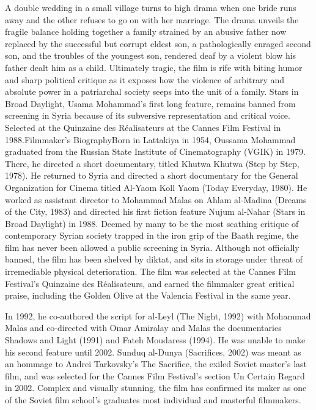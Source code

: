 \documentclass{article}
\begin{document}
A double wedding in a small village turns to high drama when one bride runs away and the other refuses to go on with her marriage. The drama unveils the fragile balance holding together a family strained by an abusive father now replaced by the successful but corrupt eldest son, a pathologically enraged second son, and the troubles of the youngest son, rendered deaf by a violent blow his father dealt him as a child. Ultimately tragic, the film is rife with biting humor and sharp political critique as it exposes how the violence of arbitrary and absolute power in a patriarchal society seeps into the unit of a family. Stars in Broad Daylight, Usama Mohammad’s first long feature, remains banned from screening in Syria because of its subversive representation and critical voice. Selected at the Quinzaine des Réalisateurs at the Cannes Film Festival in 1988.Filmmaker’s BiographyBorn in Lattakiya in 1954, Oussama Mohammad graduated from the Russian State Institute of Cinematography (VGIK) in 1979. There, he directed a short documentary, titled Khutwa Khutwa (Step by Step, 1978). He returned to Syria and directed a short documentary for the General Organization for Cinema titled Al-Yaom Koll Yaom (Today Everyday, 1980). He worked as assistant director to Mohammad Malas on Ahlam al-Madina (Dreams of the City, 1983) and directed his first fiction feature Nujum al-Nahar (Stars in Broad Daylight) in 1988. Deemed by many to be the most scathing critique of contemporary Syrian society trapped in the iron grip of the Baath regime, the film has never been allowed a public screening in Syria. Although not officially banned, the film has been shelved by diktat, and sits in storage under threat of irremediable physical deterioration. The film was selected at the Cannes Film Festival’s Quinzaine des Réalisateurs, and earned the filmmaker great critical praise, including the Golden Olive at the Valencia Festival in the same year. 

\vspace{5mm}

In 1992, he co-authored the script for al-Leyl (The Night, 1992) with Mohammad Malas and co-directed with Omar Amiralay and Malas the documentaries Shadows and Light (1991) and Fateh Moudaress (1994). He was unable to make his second feature until 2002. Sunduq al-Dunya (Sacrifices, 2002) was meant as an hommage to Andreï Tarkovsky’s The Sacrifice, the exiled Soviet master’s last film, and was selected for the Cannes Film Festival’s section Un Certain Regard in 2002. Complex and visually stunning, the film has confirmed its maker as one of the Soviet film school’s graduates most individual and masterful filmmakers.
\end{document}
